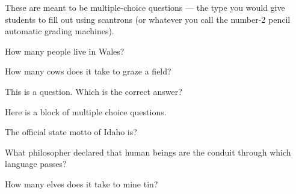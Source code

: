 \documentclass[10pt]{examdesign}
\begin{document}
\begin{multiplechoice}[title={A title}, resetcounter=no]
These are meant to be multiple-choice questions --- the type you would give
students to fill out using scantrons (or whatever you call the number-2 pencil
automatic grading machines).

\begin{question}
  How many people live in Wales?
\end{question}

\begin{question}
  How many cows does it take to graze a field?
\end{question}

\begin{question}
  This is a question.  Which is the correct answer?  \hfill
  \choice[!]{ \hfill \fbox{  }}
  \choice{ \hfill \fbox{  }}
  \choice{ \hfill \fbox{  }}
  \choice{ \hfill \fbox{  }}
  \choice{ \hfill \fbox{  }}  
\end{question}

\begin{block}
  Here is a block of multiple choice questions.
  \begin{question}
    The official state motto of Idaho is?
  \end{question}

  \begin{question}
    What philosopher declared that human beings are the conduit
    through which language passes?
  \end{question}
\end{block}

  \begin{question}
    How many elves does it take to mine tin?
  \end{question}
\end{multiplechoice}
\end{document}
